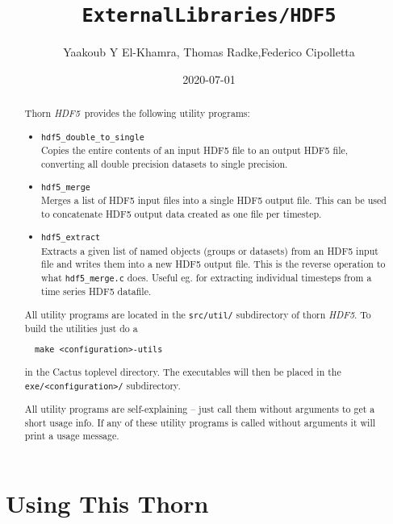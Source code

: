 \documentclass{article}
\begin{document}
\title{\tt ExternalLibraries/HDF5}
\author{Yaakoub Y El-Khamra, Thomas Radke,Federico Cipolletta}
\date{2020-07-01}

\maketitle


\ifx\ThisThorn\undefined
\newcommand{\ThisThorn}{{\it HDF5}}
\else
\renewcommand{\ThisThorn}{{\it HDF5}}
\fi

\begin{abstract}
Thorn \ThisThorn\ provides the following utility programs:
%
\begin{itemize}
  \item {\tt hdf5\_double\_to\_single}\\
    Copies the entire contents of an input HDF5 file to an output HDF5 file,
    converting all double precision datasets to single precision.
  \item {\tt hdf5\_merge}\\
    Merges a list of HDF5 input files into a single HDF5 output file.
    This can be used to concatenate HDF5 output data created as one file per
    timestep.
  \item {\tt hdf5\_extract}\\
    Extracts a given list of named objects (groups or datasets) from an HDF5
    input file and writes them into a new HDF5 output file.
    This is the reverse operation to what {\tt hdf5\_merge.c} does. Useful eg.
    for extracting individual timesteps from a time series HDF5 datafile.
\end{itemize}
%
All utility programs are located in the {\tt src/util/} subdirectory of thorn
\ThisThorn. To build the utilities just do a

\begin{verbatim}
  make <configuration>-utils
\end{verbatim}

in the Cactus toplevel directory. The executables will then be placed in the
{\tt exe/<configuration>/} subdirectory.

All utility programs are self-explaining -- just call them without arguments
to get a short usage info.
If any of these utility programs is called without arguments it will print
a usage message.
\end{abstract}

\section{Using This Thorn}
\end{document}

